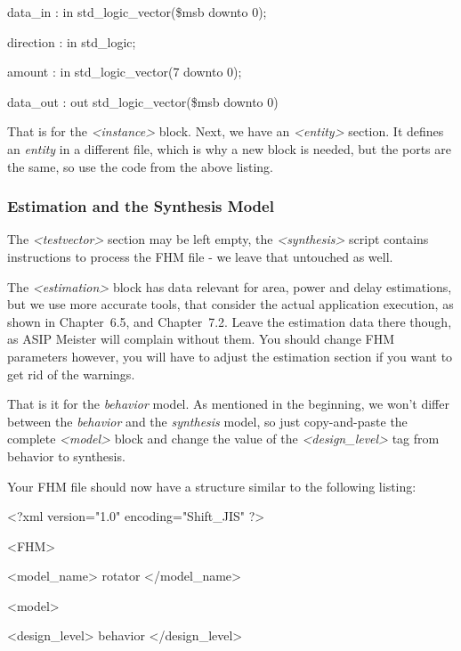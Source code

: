 \documentclass[
]{article}
\begin{document}
data\_in : in std\_logic\_vector(\$msb downto 0);

direction : in std\_logic;

amount : in std\_logic\_vector(7 downto 0);

data\_out : out std\_logic\_vector(\$msb downto 0)

That is for the \emph{\textless instance\textgreater{}} block. Next, we
have an \emph{\textless entity\textgreater{}} section. It defines an
\emph{entity} in a different file, which is why a new block is needed,
but the ports are the same, so use the code from the above listing.

\hypertarget{estimation-and-the-synthesis-model}{%
\subsubsection{Estimation and the Synthesis
Model}\label{estimation-and-the-synthesis-model}}

The \emph{\textless testvector\textgreater{}} section may be left empty,
the \emph{\textless synthesis\textgreater{}} script contains
instructions to process the FHM file - we leave that untouched as well.

The \emph{\textless estimation\textgreater{}} block has data relevant
for area, power and delay estimations, but we use more accurate tools,
that consider the actual application execution, as shown in Chapter~6.5,
and Chapter~7.2. Leave the estimation data there though, as ASIP Meister
will complain without them. You should change FHM parameters however,
you will have to adjust the estimation section if you want to get rid of
the warnings.

That is it for the \emph{behavior} model. As mentioned in the beginning,
we won't differ between the \emph{behavior} and the \emph{synthesis}
model, so just copy-and-paste the complete
\emph{\textless model\textgreater{}} block and change the value of the
\emph{\textless design\_level\textgreater{}} tag from behavior to
synthesis.

Your FHM file should now have a structure similar to the following
listing:

\textless?xml version="1.0" encoding="Shift\_JIS" ?\textgreater{}

\textless FHM\textgreater{}

\textless model\_name\textgreater{} rotator
\textless/model\_name\textgreater{}

\textless model\textgreater{}

\textless design\_level\textgreater{} behavior
\textless/design\_level\textgreater{}
\end{document}
